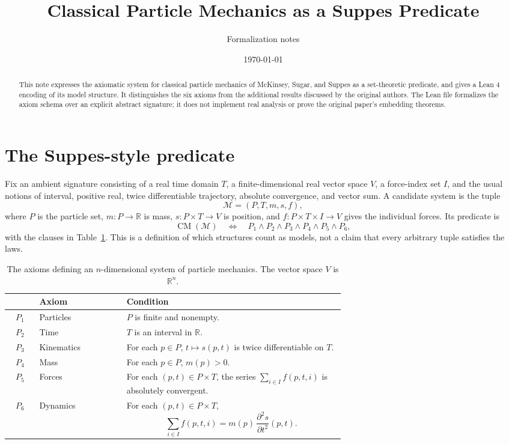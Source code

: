 \documentclass[11pt]{article}
\title{Classical Particle Mechanics as a Suppes Predicate}
\author{Formalization notes}
\date{\today}
\begin{document}
\maketitle

\begin{abstract}
This note expresses the axiomatic system for classical particle mechanics
of McKinsey, Sugar, and Suppes as a set-theoretic predicate, and gives a
Lean 4 encoding of its model structure. It distinguishes the six axioms
from the additional results discussed by the original authors. The Lean
file formalizes the axiom schema over an explicit abstract signature; it
does not implement real analysis or prove the original paper's embedding
theorems.
\end{abstract}

\section{The Suppes-style predicate}

Fix an ambient signature consisting of a real time domain $T$, a
finite-dimensional real vector space $V$, a force-index set $I$, and the
usual notions of interval, positive real, twice differentiable trajectory,
absolute convergence, and vector sum. A candidate system is the tuple
\[
  \mathcal{M} = (P,T,m,s,f),
\]
where $P$ is the particle set, $m:P\to\mathbb{R}$ is mass,
$s:P\times T\to V$ is position, and
$f:P\times T\times I\to V$ gives the individual forces. Its predicate is
\[
\operatorname{CM}(\mathcal{M}) \quad\Longleftrightarrow\quad
  P_1\land P_2\land P_3\land P_4\land P_5\land P_6,
\]
with the clauses in Table~\ref{tab:axioms}. This is a definition of which
structures count as models, not a claim that every arbitrary tuple
satisfies the laws.

\begin{table}[ht]
\centering
\begin{tabular}{@{}clp{0.65\linewidth}@{}}
\toprule
 & Axiom & Condition \\
\midrule
$P_1$ & Particles & $P$ is finite and nonempty.\\
$P_2$ & Time & $T$ is an interval in $\mathbb{R}$.\\
$P_3$ & Kinematics &
For each $p\in P$, $t\mapsto s(p,t)$ is twice differentiable on $T$.\\
$P_4$ & Mass & For each $p\in P$, $m(p)>0$.\\
$P_5$ & Forces &
For each $(p,t)\in P\times T$, the series
$\sum_{i\in I}f(p,t,i)$ is absolutely convergent.\\
$P_6$ & Dynamics &
For each $(p,t)\in P\times T$,
\[
  \sum_{i\in I} f(p,t,i)
  = m(p)\,\frac{\partial^2 s}{\partial t^2}(p,t).
\]\\
\bottomrule
\end{tabular}
\caption{The axioms defining an $n$-dimensional system of particle
mechanics. The vector space $V$ is $\mathbb{R}^n$.}
\label{tab:axioms}
\end{table}
\end{document}
